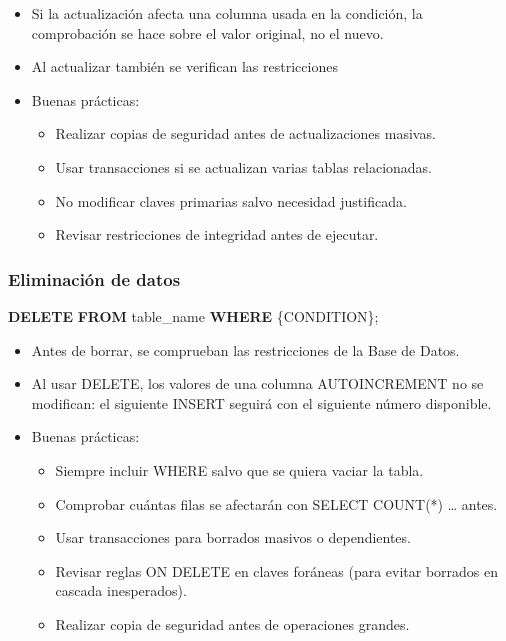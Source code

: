 \documentclass[
]{book}
\newenvironment{Shaded}{\begin{snugshade}}{\end{snugshade}}
\newcommand{\KeywordTok}[1]{\textcolor[rgb]{0.13,0.29,0.53}{\textbf{#1}}}
\newcommand{\NormalTok}[1]{#1}
\providecommand{\tightlist}{%
  \setlength{\itemsep}{0pt}\setlength{\parskip}{0pt}}
\theoremstyle{break}
\theoremstyle{nonumberplain}
\begin{document}
\begin{itemize}
\item
  Si la actualización afecta una columna usada en la condición, la comprobación se hace sobre el valor original, no el nuevo.
\item
  Al actualizar también se verifican las restricciones
\item
  Buenas prácticas:

  \begin{itemize}
  \tightlist
  \item
    Realizar copias de seguridad antes de actualizaciones masivas.
  \item
    Usar transacciones si se actualizan varias tablas relacionadas.
  \item
    No modificar claves primarias salvo necesidad justificada.
  \item
    Revisar restricciones de integridad antes de ejecutar.
  \end{itemize}
\end{itemize}

\subsubsection{Eliminación de datos}\label{eliminaciuxf3n-de-datos}

\begin{Shaded}
\begin{Highlighting}[]
\KeywordTok{DELETE} \KeywordTok{FROM}\NormalTok{ table\_name}
\KeywordTok{WHERE}\NormalTok{  \{CONDITION\};}
\end{Highlighting}
\end{Shaded}

\begin{itemize}
\tightlist
\item
  Antes de borrar, se comprueban las restricciones de la Base de Datos.
\item
  Al usar DELETE, los valores de una columna AUTOINCREMENT no se modifican: el siguiente INSERT seguirá con el siguiente número disponible.
\item
  Buenas prácticas:

  \begin{itemize}
  \tightlist
  \item
    Siempre incluir WHERE salvo que se quiera vaciar la tabla.
  \item
    Comprobar cuántas filas se afectarán con SELECT COUNT(*) \ldots{} antes.
  \item
    Usar transacciones para borrados masivos o dependientes.
  \item
    Revisar reglas ON DELETE en claves foráneas (para evitar borrados en cascada inesperados).
  \item
    Realizar copia de seguridad antes de operaciones grandes.
  \end{itemize}
\end{itemize}
\end{document}
